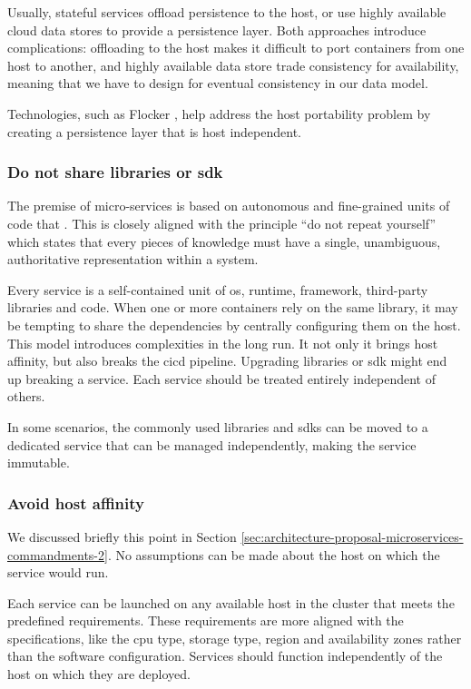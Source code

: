 Usually, stateful services offload persistence to the host, or use highly available cloud data stores to
provide a persistence layer. Both approaches introduce complications: offloading to the host makes it
difficult to port containers from one host to another, and highly available data store trade consistency
for availability, meaning that we have to design for eventual consistency in our data model.

Technologies, such as Flocker \cite{flockerHomepage}, help address the host portability problem by creating
a persistence layer that is host independent.

\subsubsection*[Commandment 2]{Do not share libraries or \ac{sdk}}
\label{sec:architecture-proposal-microservices-commandments-2}
The premise of micro-services is based on autonomous and fine-grained units of code that . This is closely aligned with the principle ``do not repeat yourself'' which
states that every pieces of knowledge must have a single, unambiguous, authoritative representation within
a system.

Every service is a self-contained unit of \acs{os}, runtime, framework, third-party libraries and code. When
one or more containers rely on the same library, it may be tempting to share the dependencies by centrally
configuring them on the host. This model introduces complexities in the long run. It not only it brings host
affinity, but also breaks the \ac{cicd} pipeline. Upgrading libraries or \ac{sdk} might end up breaking a
service. Each service should be treated entirely independent of others.

In some scenarios, the commonly used libraries and \ac{sdk}s can be moved to a dedicated service that can be
managed independently, making the service immutable.

\subsubsection*[Commandment 3]{Avoid host affinity}
\label{sec:architecture-proposal-microservices-commandments-3}
We discussed briefly this point in Section \ref{sec:architecture-proposal-microservices-commandments-2}. No
assumptions can be made about the host on which the service would run.

Each service can be launched on any available host in the cluster that meets the predefined requirements.
These requirements are more aligned with the specifications, like the \acs{cpu} type, storage type,
region and availability zones rather than the software configuration. Services should function
independently of the host on which they are deployed.


